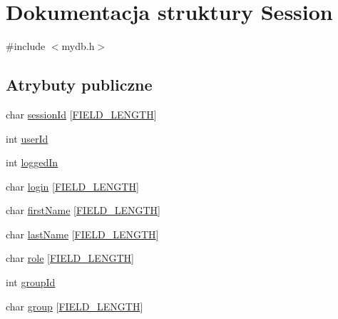 \hypertarget{structSession}{}\section{Dokumentacja struktury Session}
\label{structSession}


{\ttfamily \#include $<$mydb.\+h$>$}

\subsection*{Atrybuty publiczne}
\begin{DoxyCompactItemize}
\item 
char \mbox{\hyperlink{structSession_a447ed28ff422953c1ba4b92caa5ce1a6}{session\+Id}} \mbox{[}\mbox{\hyperlink{mydb_8h_a4e8ecaf2d59499a8c159ccdf7be1baec}{F\+I\+E\+L\+D\+\_\+\+L\+E\+N\+G\+TH}}\mbox{]}
\item 
int \mbox{\hyperlink{structSession_ae5e2fb47376e2d06efcbe3a270bae496}{user\+Id}}
\item 
int \mbox{\hyperlink{structSession_aec3947444a960feec8c28bb8521d93eb}{logged\+In}}
\item 
char \mbox{\hyperlink{structSession_a1a923454d0b48a58292073de0b698cd0}{login}} \mbox{[}\mbox{\hyperlink{mydb_8h_a4e8ecaf2d59499a8c159ccdf7be1baec}{F\+I\+E\+L\+D\+\_\+\+L\+E\+N\+G\+TH}}\mbox{]}
\item 
char \mbox{\hyperlink{structSession_a5f3b9f54574ac72566979221bfc5bb5a}{first\+Name}} \mbox{[}\mbox{\hyperlink{mydb_8h_a4e8ecaf2d59499a8c159ccdf7be1baec}{F\+I\+E\+L\+D\+\_\+\+L\+E\+N\+G\+TH}}\mbox{]}
\item 
char \mbox{\hyperlink{structSession_af1b08553bd1e57bd5ac84c3bf84ce8e4}{last\+Name}} \mbox{[}\mbox{\hyperlink{mydb_8h_a4e8ecaf2d59499a8c159ccdf7be1baec}{F\+I\+E\+L\+D\+\_\+\+L\+E\+N\+G\+TH}}\mbox{]}
\item 
char \mbox{\hyperlink{structSession_a748e8927620639e90e3ff3550d48b1ad}{role}} \mbox{[}\mbox{\hyperlink{mydb_8h_a4e8ecaf2d59499a8c159ccdf7be1baec}{F\+I\+E\+L\+D\+\_\+\+L\+E\+N\+G\+TH}}\mbox{]}
\item 
int \mbox{\hyperlink{structSession_a008e0e60299d7342dba304c88ede9d5d}{group\+Id}}
\item 
char \mbox{\hyperlink{structSession_ad76abbf72d70359b9b3a2706183150ca}{group}} \mbox{[}\mbox{\hyperlink{mydb_8h_a4e8ecaf2d59499a8c159ccdf7be1baec}{F\+I\+E\+L\+D\+\_\+\+L\+E\+N\+G\+TH}}\mbox{]}
\end{DoxyCompactItemize}


